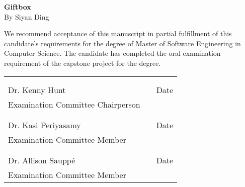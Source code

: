 \thispagestyle{empty}
\vspace*{0.3in}
\begin{center}
	\large{\textbf{Giftbox}} \\ 
	\vspace{0.25in}
	\normalsize{By Siyan Ding}
\end{center}

\vspace{0.5in}
\noindent We recommend acceptance of this manuscript in partial fulfillment of this candidate's requirements for the degree of Master of Software Engineering in Computer Science. The candidate has completed the oral examination requirement of the capstone project for the degree. \\

\noindent
\begin{tabularx}{\textwidth}{p{3in}Xp{2in}}
	\rule{0pt}{50pt} & & \\
	\hrulefill & & \hrulefill \\
	Dr. Kenny Hunt & & Date \\
	Examination Committee Chairperson & & \\
	\rule{0pt}{50pt} & & \\
	\hrulefill & & \hrulefill \\
	Dr. Kasi Periyasamy & & Date \\
	Examination Committee Member & & \\
	\rule{0pt}{50pt} & & \\
	\hrulefill & & \hrulefill \\
	Dr. Allison Saupp\'e & & Date \\
	Examination Committee Member & & \\
\end{tabularx}

